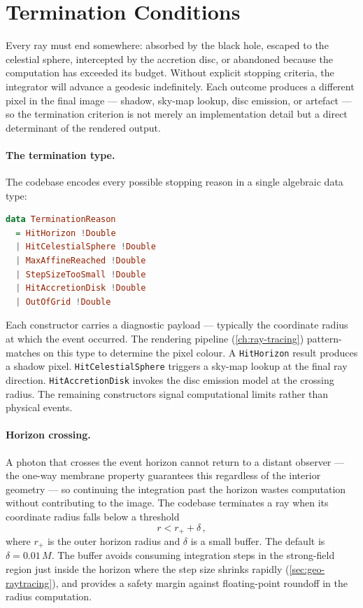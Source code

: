 \section{Termination Conditions}
\label{sec:geo-termination}

Every ray must end somewhere: absorbed by the black hole, escaped to the
celestial sphere, intercepted by the accretion disc, or abandoned because
the computation has exceeded its budget.  Without explicit stopping
criteria, the integrator will advance a geodesic indefinitely.  Each
outcome produces a different pixel in the final image --- shadow, sky-map
lookup, disc emission, or artefact --- so the termination criterion is
not merely an implementation detail but a direct determinant of the
rendered output.

\paragraph{The termination type.}

The codebase encodes every possible stopping reason in a single algebraic
data type:
%
\begin{lstlisting}[language=Haskell]
data TerminationReason
  = HitHorizon !Double
  | HitCelestialSphere !Double
  | MaxAffineReached !Double
  | StepSizeTooSmall !Double
  | HitAccretionDisk !Double
  | OutOfGrid !Double
\end{lstlisting}
%
Each constructor carries a diagnostic payload --- typically the
coordinate radius at which the event occurred.  The rendering pipeline
(\cref{ch:ray-tracing}) pattern-matches on this type to determine the
pixel colour.  A \texttt{HitHorizon} result produces a shadow pixel.
\texttt{HitCelestialSphere} triggers a sky-map lookup at the final
ray direction.  \texttt{HitAccretionDisk} invokes the disc emission
model at the crossing radius.  The remaining constructors signal
computational limits rather than physical events.

\paragraph{Horizon crossing.}

A photon that crosses the event horizon cannot return to a distant
observer --- the one-way membrane property guarantees this regardless of
the interior geometry --- so continuing the integration past the horizon
wastes computation without contributing to the image.  The codebase
terminates a ray when its coordinate radius falls below a threshold
%
\begin{equation}
  r < r_+ + \delta \,,
  \label{eq:horizon-buffer}
\end{equation}
%
where $r_+$ is the outer horizon radius and $\delta$ is a small buffer.
The default is $\delta = 0.01\,M$.  The buffer avoids consuming
integration steps in the strong-field region just inside the horizon
where the step size shrinks rapidly (\cref{sec:geo-raytracing}), and
provides a safety margin against floating-point roundoff in the radius
computation.

